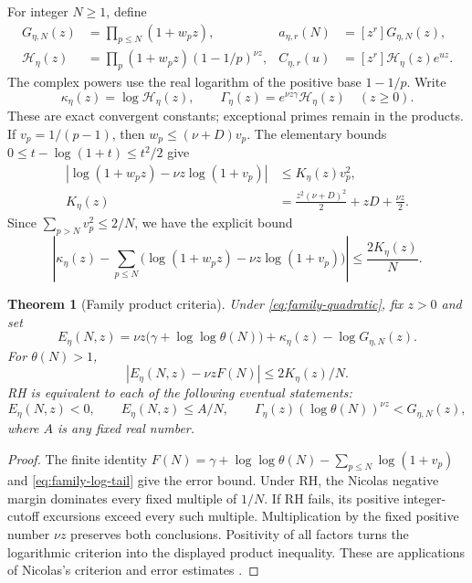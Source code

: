 \documentclass[11pt]{article}
\newtheorem{theorem}{Theorem}[section]
\theoremstyle{definition}
\begin{document}
For integer $N\ge1$, define
\begin{align*}
 G_{\eta,N}(z)&=\prod_{p\le N}(1+w_pz),&
 a_{\eta,r}(N)&=[z^r]G_{\eta,N}(z),\\
 \mathcal H_\eta(z)&=\prod_p(1+w_pz)(1-1/p)^{\nu z},&
 C_{\eta,r}(u)&=[z^r]\mathcal H_\eta(z)e^{uz}.
\end{align*}
The complex powers use the real logarithm of the positive base $1-1/p$.
Write
\[
 \kappa_\eta(z)=\log\mathcal H_\eta(z),\qquad
 \Gamma_\eta(z)=e^{\nu z\gamma}\mathcal H_\eta(z)
 \quad(z\ge0).
\]
These are exact convergent constants; exceptional primes remain in the
products. If $v_p=1/(p-1)$, then $w_p\le(\nu+D)v_p$. The elementary bounds
$0\le t-\log(1+t)\le t^2/2$ give
\[
 \begin{aligned}
 \left|\log(1+w_pz)-\nu z\log(1+v_p)\right|
 &\le K_\eta(z)v_p^2,\\
 K_\eta(z)&=\frac{z^2(\nu+D)^2}{2}+zD+\frac{\nu z}{2}.
 \end{aligned}
\]
Since $\sum_{p>N}v_p^2\le2/N$, we have the explicit bound
\begin{equation}\label{eq:family-log-tail}
 \left|\kappa_\eta(z)-
   \sum_{p\le N}\bigl(\log(1+w_pz)-\nu z\log(1+v_p)\bigr)\right|
 \le \frac{2K_\eta(z)}N .
\end{equation}

\begin{theorem}[Family product criteria]\label{thm:family-product}
Under \eqref{eq:family-quadratic}, fix $z>0$ and set
\[
 E_\eta(N,z)=
 \nu z\bigl(\gamma+\log\log\theta(N)\bigr)+\kappa_\eta(z)
 -\log G_{\eta,N}(z).
\]
For $\theta(N)>1$,
\[
 |E_\eta(N,z)-\nu zF(N)|\le 2K_\eta(z)/N.
\]
RH is equivalent to each of the following eventual statements:
\[
 E_\eta(N,z)<0,\qquad E_\eta(N,z)\le A/N,\qquad
 \Gamma_\eta(z)(\log\theta(N))^{\nu z}<G_{\eta,N}(z),
\]
where $A$ is any fixed real number.
\end{theorem}
\begin{proof}
The finite identity
$F(N)=\gamma+\log\log\theta(N)-\sum_{p\le N}\log(1+v_p)$
and \eqref{eq:family-log-tail} give the error bound.
Under RH, the Nicolas negative margin dominates every fixed multiple
of $1/N$. If RH fails, its positive integer-cutoff excursions exceed
every such multiple. Multiplication by the fixed positive number
$\nu z$ preserves both conclusions. Positivity of all factors turns
the logarithmic criterion into the displayed product inequality.
These are applications of Nicolas's criterion and error estimates
\cite[(1.10), Proposition~2.1]{Nicolas2012}.
\end{proof}
\end{document}
